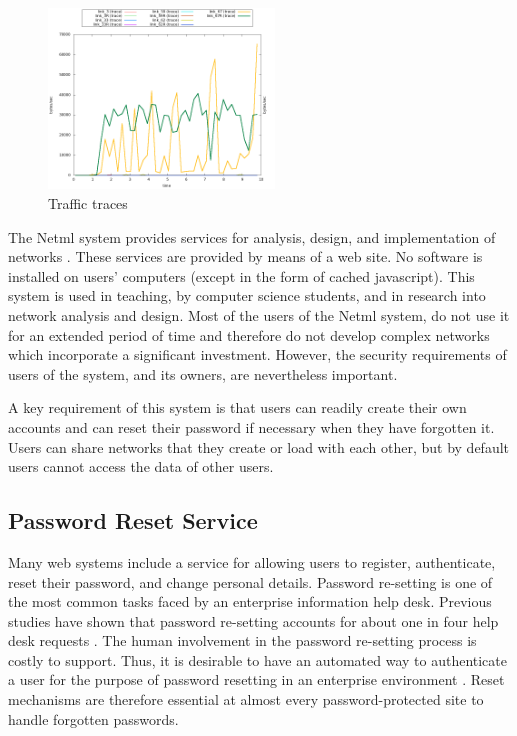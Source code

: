 \begin{figure}
	\centering
		\includegraphics[width=6cm]{figures/vpn_traffic.png}
\caption{Traffic traces}
\label{Traffictraces}
\end{figure}
\fi
The Netml system provides services for analysis, design, and implementation
of networks \cite{addie2011netml}. These services are provided by means of a web
site. No software is installed on users' computers (except in the form
of cached javascript). This system is used in teaching, by
computer science students, and in research into network analysis and design. 
\iflonger
Most of the users of the Netml system, do not use it for an extended period of
time and therefore do not develop complex networks which incorporate a significant
investment. However, the security requirements of users of the system, and
its owners, are nevertheless important.
\fi

A key requirement of this system is that users can readily create their own
accounts and can reset their password if necessary when they have forgotten it.
Users can share networks that they create or load with each other, but by default
users cannot access the data of other users.

\subsection{Password Reset Service}
Many web systems include a service for allowing users to register,
authenticate, reset their password, and change personal details.
Password re-setting is one of the most common tasks faced by an
enterprise information help desk. Previous studies have shown that password
re-setting accounts for about one in four help desk requests \cite{bailey2014statistics}. The
human involvement in the password re-setting process is costly to
support. Thus, it is desirable to have an automated way to
authenticate a user for the purpose of password resetting in an
enterprise environment \cite{nimmy2014novel}. Reset mechanisms are therefore
essential at almost every password-protected site to handle forgotten
passwords. 

